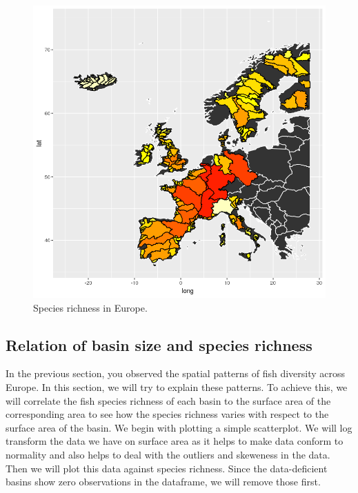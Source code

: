 \documentclass[
]{book}
\begin{document}
\begin{figure}
\includegraphics[width=11.67in]{./figures/output_204_0} \caption{Species richness in Europe.}\label{fig:europe3}
\end{figure}

\hypertarget{relation-of-basin-size-and-species-richness}{%
\subsection{Relation of basin size and species richness}\label{relation-of-basin-size-and-species-richness}}

In the previous section, you observed the spatial patterns of fish diversity across Europe. In this section, we will try to explain these patterns. To achieve this, we will correlate the fish species richness of each basin to the surface area of the corresponding area to see how the species richness varies with respect to the surface area of the basin. We begin with plotting a simple scatterplot. We will log transform the data we have on surface area as it helps to make data conform to normality and also helps to deal with the outliers and skeweness in the data. Then we will plot this data against species richness. Since the data-deficient basins show zero observations in the dataframe, we will remove those first.
\end{document}
